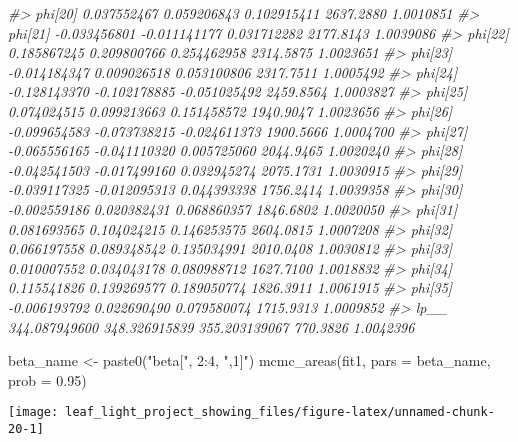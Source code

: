 \documentclass[
]{article}
\newenvironment{Shaded}{\begin{snugshade}}{\end{snugshade}}
\newcommand{\AttributeTok}[1]{\textcolor[rgb]{0.77,0.63,0.00}{#1}}
\newcommand{\CommentTok}[1]{\textcolor[rgb]{0.56,0.35,0.01}{\textit{#1}}}
\newcommand{\DecValTok}[1]{\textcolor[rgb]{0.00,0.00,0.81}{#1}}
\newcommand{\FloatTok}[1]{\textcolor[rgb]{0.00,0.00,0.81}{#1}}
\newcommand{\FunctionTok}[1]{\textcolor[rgb]{0.00,0.00,0.00}{#1}}
\newcommand{\NormalTok}[1]{#1}
\newcommand{\OtherTok}[1]{\textcolor[rgb]{0.56,0.35,0.01}{#1}}
\newcommand{\SpecialCharTok}[1]{\textcolor[rgb]{0.00,0.00,0.00}{#1}}
\newcommand{\StringTok}[1]{\textcolor[rgb]{0.31,0.60,0.02}{#1}}
\begin{document}
\begin{Shaded}
\begin{Highlighting}[]
\CommentTok{\#\textgreater{} phi[20]       0.037552467   0.059206843   0.102915411 2637.2880 1.0010851}
\CommentTok{\#\textgreater{} phi[21]      {-}0.033456801  {-}0.011141177   0.031712282 2177.8143 1.0039086}
\CommentTok{\#\textgreater{} phi[22]       0.185867245   0.209800766   0.254462958 2314.5875 1.0023651}
\CommentTok{\#\textgreater{} phi[23]      {-}0.014184347   0.009026518   0.053100806 2317.7511 1.0005492}
\CommentTok{\#\textgreater{} phi[24]      {-}0.128143370  {-}0.102178885  {-}0.051025492 2459.8564 1.0003827}
\CommentTok{\#\textgreater{} phi[25]       0.074024515   0.099213663   0.151458572 1940.9047 1.0023656}
\CommentTok{\#\textgreater{} phi[26]      {-}0.099654583  {-}0.073738215  {-}0.024611373 1900.5666 1.0004700}
\CommentTok{\#\textgreater{} phi[27]      {-}0.065556165  {-}0.041110320   0.005725060 2044.9465 1.0020240}
\CommentTok{\#\textgreater{} phi[28]      {-}0.042541503  {-}0.017499160   0.032945274 2075.1731 1.0030915}
\CommentTok{\#\textgreater{} phi[29]      {-}0.039117325  {-}0.012095313   0.044393338 1756.2414 1.0039358}
\CommentTok{\#\textgreater{} phi[30]      {-}0.002559186   0.020382431   0.068860357 1846.6802 1.0020050}
\CommentTok{\#\textgreater{} phi[31]       0.081693565   0.104024215   0.146253575 2604.0815 1.0007208}
\CommentTok{\#\textgreater{} phi[32]       0.066197558   0.089348542   0.135034991 2010.0408 1.0030812}
\CommentTok{\#\textgreater{} phi[33]       0.010007552   0.034043178   0.080988712 1627.7100 1.0018832}
\CommentTok{\#\textgreater{} phi[34]       0.115541826   0.139269577   0.189050774 1826.3911 1.0061915}
\CommentTok{\#\textgreater{} phi[35]      {-}0.006193792   0.022690490   0.079580074 1715.9313 1.0009852}
\CommentTok{\#\textgreater{} lp\_\_        344.087949600 348.326915839 355.203139067  770.3826 1.0042396}
\end{Highlighting}
\end{Shaded}

\begin{Shaded}
\begin{Highlighting}[]
\NormalTok{beta\_name }\OtherTok{\textless{}{-}} \FunctionTok{paste0}\NormalTok{(}\StringTok{"beta["}\NormalTok{, }\DecValTok{2}\SpecialCharTok{:}\DecValTok{4}\NormalTok{, }\StringTok{",1]"}\NormalTok{)}
\FunctionTok{mcmc\_areas}\NormalTok{(fit1,}
           \AttributeTok{pars =}\NormalTok{ beta\_name,}
           \AttributeTok{prob =} \FloatTok{0.95}\NormalTok{)}
\end{Highlighting}
\end{Shaded}

\begin{center}\texttt{[image: leaf\_light\_project\_showing\_files/figure-latex/unnamed-chunk-20-1]} \end{center}
\end{document}
